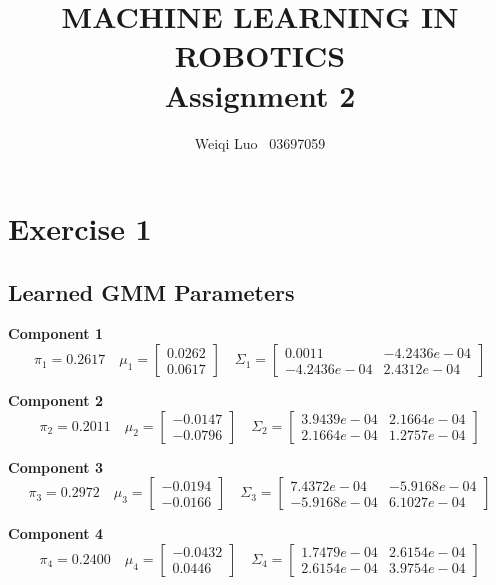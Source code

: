 \documentclass{article}
\begin{document}
\title{MACHINE LEARNING IN ROBOTICS \\ Assignment 2}
\author{Weiqi Luo \ 03697059}

\maketitle
\newpage

\section{Exercise 1}
\subsection{Learned GMM Parameters}
\begin{center}

\textbf{Component 1}
$$
\pi_1 = 0.2617 \quad
\mu_1=
\begin{bmatrix}
0.0262  \\  0.0617
\end{bmatrix}
\quad
\Sigma_1=
\begin{bmatrix}
0.0011 & -4.2436e-04 \\
-4.2436e-04  & 2.4312e-04
\end{bmatrix}
$$

\textbf{Component 2}
$$
\pi_2 = 0.2011 \quad
\mu_2=
\begin{bmatrix}
-0.0147 \\  -0.0796
\end{bmatrix}
\quad
\Sigma_2=
\begin{bmatrix}
3.9439e-04  & 2.1664e-04 \\
2.1664e-04  & 1.2757e-04
\end{bmatrix}
$$
	
\textbf{Component 3}
$$
\pi_3 = 0.2972 \quad
\mu_3=
\begin{bmatrix}
-0.0194 \\  -0.0166
\end{bmatrix}
\quad
\Sigma_3=
\begin{bmatrix}
   7.4372e-04 & -5.9168e-04 \\
   -5.9168e-04 &  6.1027e-04
\end{bmatrix}
$$

\textbf{Component 4}
$$
\pi_4 = 0.2400 \quad
\mu_4=
\begin{bmatrix}
-0.0432  \\  0.0446
\end{bmatrix}
\quad
\Sigma_4=
\begin{bmatrix}
1.7479e-04  & 2.6154e-04 \\
2.6154e-04  & 3.9754e-04
\end{bmatrix}
$$


\end{center}
\end{document}
